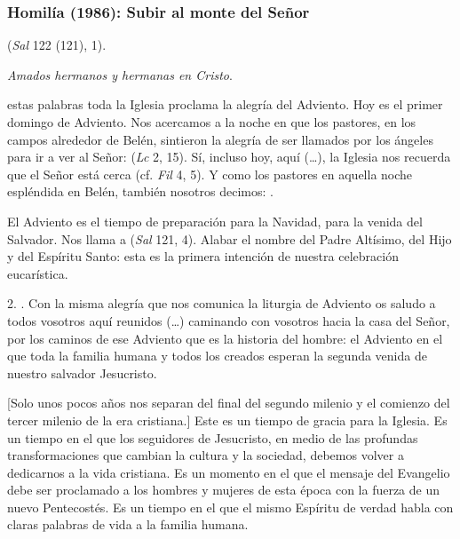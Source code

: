 \newpage
\subsubsection{Homilía (1986): Subir al monte del Señor}


\begin{body}
	 (\emph{Sal} 122 (121), 1). 
	
	\emph{Amados hermanos y hermanas en Cristo}. 
	
	 estas palabras toda la Iglesia proclama la alegría del Adviento. Hoy es el primer domingo de Adviento. Nos acercamos a la noche en que los pastores, en los campos alrededor de Belén, sintieron la alegría de ser llamados por los ángeles para ir a ver al Señor:  (\emph{Lc} 2, 15). Sí, incluso hoy, aquí (\ldots{}), la Iglesia nos recuerda que el Señor está cerca (cf. \emph{Fil} 4, 5). Y como los pastores en aquella noche espléndida en Belén, también nosotros decimos: .
	
	El Adviento es el tiempo de preparación para la Navidad, para la venida del Salvador. Nos llama a  (\emph{Sal} 121, 4). Alabar el nombre del Padre Altísimo, del Hijo y del Espíritu Santo: esta es la primera intención de nuestra celebración eucarística.
	
	2. . Con la misma alegría que nos comunica la liturgia de Adviento os saludo a todos vosotros aquí reunidos (\ldots{}) caminando con vosotros hacia la casa del Señor, por los caminos de ese Adviento que es la historia del hombre: el Adviento en el que toda la familia humana y todos los creados esperan la segunda venida de nuestro salvador Jesucristo.
	
	{[}Solo unos pocos años nos separan del final del segundo milenio y el comienzo del tercer milenio de la era cristiana.{]} Este es un tiempo de gracia para la Iglesia. Es un tiempo en el que los seguidores de Jesucristo, en medio de las profundas transformaciones que cambian la cultura y la sociedad, debemos volver a dedicarnos a la vida cristiana. Es un momento en el que el mensaje del Evangelio debe ser proclamado a los hombres y mujeres de esta época con la fuerza de un nuevo Pentecostés. Es un tiempo en el que el mismo Espíritu de verdad habla con claras palabras de vida a la familia humana.
	

\end{body}
